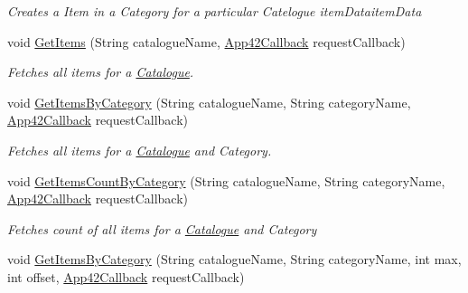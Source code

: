 \begin{DoxyCompactItemize}
\begin{DoxyCompactList}\small\item\em Creates a Item in a Category for a particular Catelogue item\+Dataitem\+Data\end{DoxyCompactList}\item 
void \hyperlink{classcom_1_1shephertz_1_1app42_1_1paas_1_1sdk_1_1windows_1_1shopping_1_1_catalogue_service_a66f0a47be5a999a51efec2f2205a6155}{Get\+Items} (String catalogue\+Name, \hyperlink{interfacecom_1_1shephertz_1_1app42_1_1paas_1_1sdk_1_1windows_1_1_app42_callback}{App42\+Callback} request\+Callback)
\begin{DoxyCompactList}\small\item\em Fetches all items for a \hyperlink{classcom_1_1shephertz_1_1app42_1_1paas_1_1sdk_1_1windows_1_1shopping_1_1_catalogue}{Catalogue}. \end{DoxyCompactList}\item 
void \hyperlink{classcom_1_1shephertz_1_1app42_1_1paas_1_1sdk_1_1windows_1_1shopping_1_1_catalogue_service_a4f8a64b8538f8c098f803d734bb5d433}{Get\+Items\+By\+Category} (String catalogue\+Name, String category\+Name, \hyperlink{interfacecom_1_1shephertz_1_1app42_1_1paas_1_1sdk_1_1windows_1_1_app42_callback}{App42\+Callback} request\+Callback)
\begin{DoxyCompactList}\small\item\em Fetches all items for a \hyperlink{classcom_1_1shephertz_1_1app42_1_1paas_1_1sdk_1_1windows_1_1shopping_1_1_catalogue}{Catalogue} and Category. \end{DoxyCompactList}\item 
void \hyperlink{classcom_1_1shephertz_1_1app42_1_1paas_1_1sdk_1_1windows_1_1shopping_1_1_catalogue_service_acb3518d49180b952cb7362291e36dbbf}{Get\+Items\+Count\+By\+Category} (String catalogue\+Name, String category\+Name, \hyperlink{interfacecom_1_1shephertz_1_1app42_1_1paas_1_1sdk_1_1windows_1_1_app42_callback}{App42\+Callback} request\+Callback)
\begin{DoxyCompactList}\small\item\em Fetches count of all items for a \hyperlink{classcom_1_1shephertz_1_1app42_1_1paas_1_1sdk_1_1windows_1_1shopping_1_1_catalogue}{Catalogue} and Category \end{DoxyCompactList}\item 
void \hyperlink{classcom_1_1shephertz_1_1app42_1_1paas_1_1sdk_1_1windows_1_1shopping_1_1_catalogue_service_a16d94b385a23ed3a3dc04aab8555b82b}{Get\+Items\+By\+Category} (String catalogue\+Name, String category\+Name, int max, int offset, \hyperlink{interfacecom_1_1shephertz_1_1app42_1_1paas_1_1sdk_1_1windows_1_1_app42_callback}{App42\+Callback} request\+Callback)

\end{DoxyCompactItemize}
